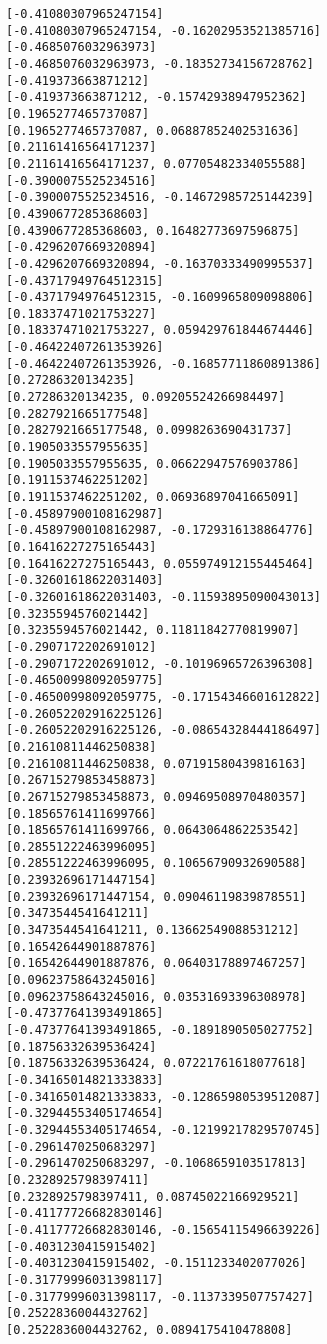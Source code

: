 \documentclass[11pt]{article}
\begin{document}
\begin{Verbatim}[commandchars=\\\{\}]
[-0.41080307965247154]
[-0.41080307965247154, -0.16202953521385716]
[-0.4685076032963973]
[-0.4685076032963973, -0.18352734156728762]
[-0.419373663871212]
[-0.419373663871212, -0.15742938947952362]
[0.1965277465737087]
[0.1965277465737087, 0.06887852402531636]
[0.21161416564171237]
[0.21161416564171237, 0.07705482334055588]
[-0.3900075525234516]
[-0.3900075525234516, -0.14672985725144239]
[0.4390677285368603]
[0.4390677285368603, 0.16482773697596875]
[-0.4296207669320894]
[-0.4296207669320894, -0.16370333490995537]
[-0.43717949764512315]
[-0.43717949764512315, -0.1609965809098806]
[0.18337471021753227]
[0.18337471021753227, 0.059429761844674446]
[-0.46422407261353926]
[-0.46422407261353926, -0.16857711860891386]
[0.27286320134235]
[0.27286320134235, 0.09205524266984497]
[0.2827921665177548]
[0.2827921665177548, 0.0998263690431737]
[0.1905033557955635]
[0.1905033557955635, 0.06622947576903786]
[0.1911537462251202]
[0.1911537462251202, 0.06936897041665091]
[-0.45897900108162987]
[-0.45897900108162987, -0.1729316138864776]
[0.16416227275165443]
[0.16416227275165443, 0.055974912155445464]
[-0.32601618622031403]
[-0.32601618622031403, -0.11593895090043013]
[0.3235594576021442]
[0.3235594576021442, 0.11811842770819907]
[-0.2907172202691012]
[-0.2907172202691012, -0.10196965726396308]
[-0.46500998092059775]
[-0.46500998092059775, -0.17154346601612822]
[-0.26052202916225126]
[-0.26052202916225126, -0.08654328444186497]
[0.21610811446250838]
[0.21610811446250838, 0.07191580439816163]
[0.26715279853458873]
[0.26715279853458873, 0.09469508970480357]
[0.18565761411699766]
[0.18565761411699766, 0.0643064862253542]
[0.28551222463996095]
[0.28551222463996095, 0.10656790932690588]
[0.23932696171447154]
[0.23932696171447154, 0.09046119839878551]
[0.3473544541641211]
[0.3473544541641211, 0.13662549088531212]
[0.16542644901887876]
[0.16542644901887876, 0.06403178897467257]
[0.09623758643245016]
[0.09623758643245016, 0.03531693396308978]
[-0.47377641393491865]
[-0.47377641393491865, -0.1891890505027752]
[0.18756332639536424]
[0.18756332639536424, 0.07221761618077618]
[-0.34165014821333833]
[-0.34165014821333833, -0.12865980539512087]
[-0.32944553405174654]
[-0.32944553405174654, -0.12199217829570745]
[-0.2961470250683297]
[-0.2961470250683297, -0.1068659103517813]
[0.2328925798397411]
[0.2328925798397411, 0.08745022166929521]
[-0.41177726682830146]
[-0.41177726682830146, -0.15654115496639226]
[-0.4031230415915402]
[-0.4031230415915402, -0.1511233402077026]
[-0.31779996031398117]
[-0.31779996031398117, -0.1137339507757427]
[0.2522836004432762]
[0.2522836004432762, 0.0894175410478808]

\end{Verbatim}
\end{document}
